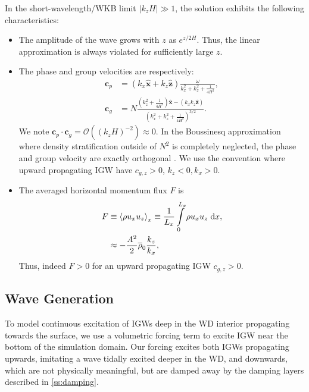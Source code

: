 \documentclass[
        fleqn,
        usenatbib,
        referee,
    ]{mnras}
\newcommand*{\abs}[1]{\left|#1\right|}
\newcommand*{\ev}[1]{\left\langle#1\right\rangle}
\newcommand*{\p}[1]{\left(#1\right)}
\newcommand*{\bm}[1]{\mathbf{#1}}
\newcommand*{\uv}[1]{\hat{\mathbf{#1}}}
\begin{document}
In the short-wavelength/WKB limit $\abs{k_{z}H} \gg 1$, the solution exhibits
the following characteristics:
\begin{itemize}
    \item The amplitude of the wave grows with $z$ as $e^{z/2H}$. Thus, the
        linear approximation is always violated for sufficiently large $z$.

    \item The phase and group velocities are respectively:
        \begin{align}
            \bm{c}_{p} &=
                \p{k_{x}\uv{x} + k_{z}\uv{z}}\frac{\omega}
                {k_{x}^2 + k_{z}^2 + \frac{1}{4H^2}},\\
            \bm{c}_{g} &= N\frac{\p{k_{z}^2 + \frac{1}{4H^2}}\uv{x}
                - \p{k_{x}k_{z}\uv{z}}}
                {\p{k_{x}^2 + k_{z}^2 + \frac{1}{4H^2}}^{3/2}}.\label{eq:vg}
        \end{align}
        We note $\bm{c}_{p} \cdot \bm{c}_g = \mathcal{O}\p{ \p{k_{z}H}^{-2} }
        \approx 0$. In the Boussinesq approximation where density stratification
        outside of $N^2$ is completely neglected, the phase and group velocity
        are exactly orthogonal \citep{drazin,sutherland1}. We use the convention
        where upward propagating IGW have $c_{g, z} > 0$, $k_z < 0, k_x > 0$.

    \item The averaged horizontal momentum flux $F$ is
        \begin{align}
            F &\equiv \ev{\rho u_{x} u_{z}}_x \equiv
                \frac{1}{L_x}\int_0^{L_x}\limits \rho u_{x}u_{z}\;\mathrm{d}x,
                    \label{eq:F_def}\\
                &\approx -\frac{A^2}{2}\overline{\rho}_0\frac{k_{z}}{k_{x}},
                    \label{eq:S_lin}
        \end{align}
        Thus, indeed $F > 0$ for an upward propagating IGW $c_{g, z} > 0$.
\end{itemize}

\subsection{Wave Generation}

To model continuous excitation of IGWs deep in the WD interior propagating
towards the surface, we use a volumetric forcing term to excite IGW near the
bottom of the simulation domain. Our forcing excites both IGWs
propagating upwards, imitating a wave tidally excited deeper in the WD, and
downwards, which are not physically meaningful, but are damped away by the
damping layers described in \autoref{ss:damping}.
\end{document}
